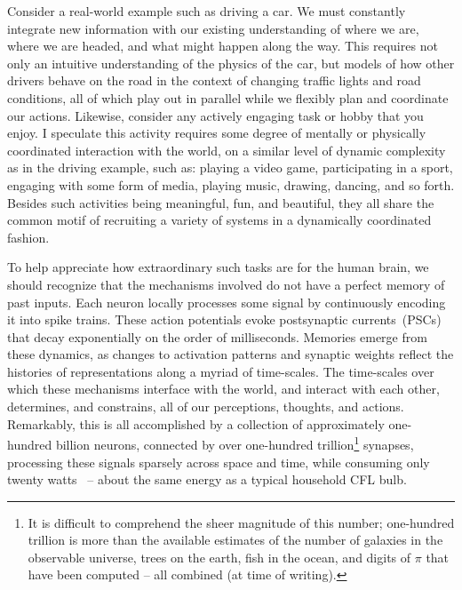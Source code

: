 Consider a real-world example such as driving a car. We must constantly integrate new information with our existing understanding of where we are, where we are headed, and what might happen along the way.
This requires not only an intuitive understanding of the physics of the car, but models of how other drivers behave on the road in the context of changing traffic lights and road conditions, all of which play out in parallel while we flexibly plan and coordinate our actions.
Likewise, consider any actively engaging task or hobby that you enjoy.
I speculate this activity requires some degree of mentally or physically coordinated interaction with the world, on a similar level of dynamic complexity as in the driving example, such as: playing a video game, participating in a sport, engaging with some form of media, playing music, drawing, dancing, and so forth.
Besides such activities being meaningful, fun, and beautiful, they all share the common motif of recruiting a variety of systems in a dynamically coordinated fashion.

To help appreciate how extraordinary such tasks are for the human brain, we should recognize that the mechanisms involved do not have a perfect memory of past inputs.
Each neuron locally processes some signal by continuously encoding it into spike trains.
These action potentials evoke postsynaptic currents~(PSCs) that decay exponentially on the order of milliseconds.
Memories emerge from these dynamics, as changes to activation patterns and synaptic weights reflect the histories of representations along a myriad of time-scales.
The time-scales over which these mechanisms interface with the world, and interact with each other, determines, and constrains, all of our perceptions, thoughts, and actions.
Remarkably, this is all accomplished by a collection of approximately one-hundred billion neurons, connected by over one-hundred trillion\footnote{%
It is difficult to comprehend the sheer magnitude of this number; one-hundred trillion is more than the available estimates of the number of galaxies in the observable universe, trees on the earth, fish in the ocean, and digits of $\pi$ that have been computed -- all combined (at time of writing).
}
synapses, processing these signals sparsely across space and time, while consuming only twenty watts~\citep{koch2014} -- about the same energy as a typical household CFL bulb.

